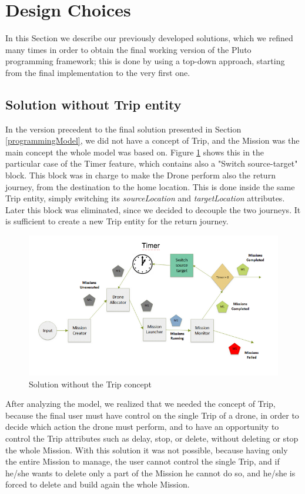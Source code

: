 \section{Design Choices}\label{history}

In this Section we describe our previously developed solutions, which we refined many times in order to obtain the final working version of the Pluto programming framework; this is done by using a top-down approach, starting from the final implementation to the very first one.

\subsection{Solution without Trip entity}

In the version precedent to the final solution presented in Section \ref{programmingModel}, we did not have a concept of Trip, and the Mission was the main concept the whole model was based on. 
Figure \ref{fig:noTrip} shows this in the particular case of the Timer feature, which contains also a "Switch source-target" block. 
This block was in charge to make the Drone perform also the return journey, from the destination to the home location.
This is done inside the same Trip entity, simply switching its \textit{sourceLocation} and \textit{targetLocation} attributes.
Later this block was eliminated, since we decided to decouple the two journeys.
It is sufficient to create a new Trip entity for the return journey.

\begin{figure}[h!]
  \centering
  \includegraphics[width=\linewidth]{pictures/NoTrip.png}
  \caption{Solution without the Trip concept}
  \label{fig:noTrip}
\end{figure}

After analyzing the model, we realized that we needed the concept of Trip, because the final user must have control on the single Trip of a drone, in order to decide which action the drone must perform, and to have an opportunity to control the Trip attributes such as delay, stop, or delete, without deleting or stop the whole Mission. 
With this solution it was not possible, because having only the entire Mission to manage, the user cannot control the single Trip, and if he/she wants to delete only a part of the Mission he cannot do so, and he/she is forced to delete and build again the whole Mission.

